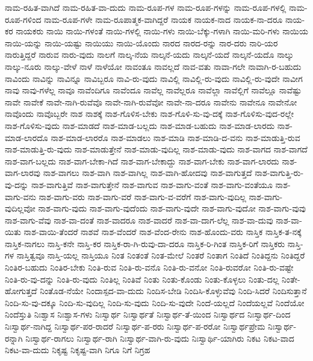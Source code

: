 {ನಾಮ-ರಹಿತ-ವಾಗಿದೆ
ನಾಮ-ರಹಿತ-ವಾ-ದುದು
ನಾಮ-ರೂಪ-ಗಳ
ನಾಮ-ರೂಪ-ಗಳನ್ನು
ನಾಮ-ರೂಪ-ಗಳಲ್ಲಿ
ನಾಮ-ರೂಪ-ಗಳಿಂದ
ನಾಮ-ರೂಪ-ಗಳೇ
ನಾಮ-ರೂಪಾತ್ಮಕ-ವಾಗಿದ್ದರೆ
ನಾಯಕ
ನಾಯಕ-ನಾದ
ನಾಯಕ-ನಾ-ದರೂ
ನಾಯ-ಕರ
ನಾಯಕರು
ನಾಯಿ
ನಾಯಿ-ಗಳಂತೆ
ನಾಯಿ-ಗಳಲ್ಲಿ
ನಾಯಿ-ಗಳು
ನಾಯಿ-ಬೆಕ್ಕು-ಗಳಾಗಿ
ನಾಯಿ-ಮರಿ-ಗಳು
ನಾಯಿಯ
ನಾಯಿ-ಯನ್ನು
ನಾಯಿ-ಯಷ್ಟು
ನಾಯಿಯು
ನಾಯಿ-ಯೊಂದು
ನಾರದ
ನಾರದ-ರನ್ನು
ನಾರ-ದರು
ನಾರಿ-ಯರ
ನಾರುತ್ತಿದ್ದರೆ
ನಾರುವ
ನಾರು-ವುದು
ನಾಲಗೆ
ನಾಲ್ಕ-ನೆಯ
ನಾಲ್ಕನೆ-ಯದು
ನಾಲ್ಕನೆ-ಯದೆ
ನಾಲ್ಕನೆ-ಯದೊ
ನಾಲ್ಕು
ನಾಲ್ಕು-ನೂರು
ನಾಲ್ಕು-ವೇಳೆ
ನಾಳೆ
ನಾಳೆಯೋ
ನಾವಂತೂ
ನಾವಲ್ಲದೆ
ನಾವ-ವತು
ನಾವಾ-ಗಲೇ
ನಾವಾಗಿ-ರ-ಬಹುದು
ನಾವಿಂದು
ನಾವಿನ್ನು
ನಾವಿನ್ನೂ
ನಾವಿಬ್ಬರೂ
ನಾವಿ-ರು-ವುದು
ನಾವಿಲ್ಲಿ
ನಾವಿಲ್ಲಿ-ರು-ವುದು
ನಾವಿಲ್ಲಿ-ರು-ವುದೇ
ನಾವೀಗ
ನಾವು
ನಾವು-ಗಳೆಲ್ಲ
ನಾವೂ
ನಾವೆಂದಿಗೂ
ನಾವೆಂದೂ
ನಾವೆಲ್ಲ
ನಾವೆಲ್ಲರೂ
ನಾವೆಲ್ಲಾ
ನಾವೆಲ್ಲಿಗೆ
ನಾವೆಲ್ಲೂ
ನಾವೆಷ್ಟು
ನಾವೇ
ನಾವೇಕೆ
ನಾವೇ-ನಾಗಿ-ರುವೆವೊ
ನಾವೇ-ನಾಗಿ-ರುವೆವೋ
ನಾವೇ-ನಾ-ದರೂ
ನಾವೇನು
ನಾವೇನೂ
ನಾವೇನೋ
ನಾವೊಂದು
ನಾವೊಬ್ಬರೇ
ನಾಶ
ನಾಶಕ್ಕೆ
ನಾಶ-ಗೊಳಿಸ-ಬೇಕು
ನಾಶ-ಗೊಳಿ-ಸು-ವು-ದಕ್ಕೆ
ನಾಶ-ಗೊಳಿಸು-ವುದ-ರಲ್ಲೇ
ನಾಶ-ಗೊಳಿಸು-ವುದು
ನಾಶ-ಮಾಡದೆ
ನಾಶ-ಮಾಡ-ಬಲ್ಲದು
ನಾಶ-ಮಾಡ-ಬಹುದು
ನಾಶ-ಮಾಡ-ಲಾರದು
ನಾಶ-ಮಾಡ-ಲಾರದೊ
ನಾಶ-ಮಾಡ-ಲಾರರೊ
ನಾಶ-ಮಾಡಲು
ನಾಶ-ಮಾಡಿ
ನಾಶ-ಮಾಡಿ-ದ-ವನು
ನಾಶ-ಮಾಡುತ್ತಿ-ರುವ
ನಾಶ-ಮಾಡುತ್ತಿ-ರು-ವುದು
ನಾಶ-ಮಾಡುತ್ತೇನೆ
ನಾಶ-ಮಾಡು-ವುದಿಲ್ಲ
ನಾಶ-ಮಾಡು-ವುದು
ನಾಶ-ವಾಗದ
ನಾಶ-ವಾಗದೆ
ನಾಶ-ವಾಗ-ಬಲ್ಲದು
ನಾಶ-ವಾಗ-ಬೇಕಾ-ಗಿದೆ
ನಾಶ-ವಾಗ-ಬೇಕಾದ್ದು
ನಾಶ-ವಾಗ-ಬೇಕು
ನಾಶ-ವಾಗ-ಲಾರದು
ನಾಶ-ವಾಗ-ಲಾರವು
ನಾಶ-ವಾಗಲು
ನಾಶ-ವಾಗಿ
ನಾಶ-ವಾಗಿಲ್ಲ
ನಾಶ-ವಾಗಿ-ಹೋದವು
ನಾಶ-ವಾಗುತ್ತದೆ
ನಾಶ-ವಾಗುತ್ತಿ-ರು-ವು-ದನ್ನು
ನಾಶ-ವಾಗುತ್ತಿವೆ
ನಾಶ-ವಾಗುತ್ತೇನೆ
ನಾಶ-ವಾಗುವ
ನಾಶ-ವಾಗು-ವಂತೆ
ನಾಶ-ವಾಗು-ವಂತೆಯೂ
ನಾಶ-ವಾಗು-ವನು
ನಾಶ-ವಾಗು-ವರು
ನಾಶ-ವಾಗು-ವರೆ
ನಾಶ-ವಾಗು-ವ-ವರೆಗೆ
ನಾಶ-ವಾಗು-ವುದಿಲ್ಲ
ನಾಶ-ವಾಗು-ವುದಿಲ್ಲವೋ
ನಾಶ-ವಾಗು-ವುದು
ನಾಶ-ವಾಗು-ವುದೆಂದು
ನಾಶ-ವಾಗು-ವುದೇ
ನಾಶ-ವಾಗು-ವುದೋ
ನಾಶ-ವಾಗು-ವುವು
ನಾಶ-ವಾಗು-ವೆವು
ನಾಶ-ವಾ-ದಂತೆ
ನಾಶ-ವಾದರೂ
ನಾಶ-ವಾದರೆ
ನಾಶ-ವಾ-ದಾಗ-ಲೆಲ್ಲ
ನಾಶ-ವಾ-ದುವು
ನಾಶ-ವಾ-ಯಿತು
ನಾಶ-ವಾಯಿ-ತೆಂದರೆ
ನಾಶವೆ
ನಾಶ-ವೆಂದರೆ
ನಾಶ-ವೆಂದ-ರೇನು
ನಾಶ-ಹೊಂದು-ವರು
ನಾಸ್ತಿಕ
ನಾಸ್ತಿಕ-ತ-ನಕ್ಕೆ
ನಾಸ್ತಿಕ-ನಾಗಲು
ನಾಸ್ತಿ-ಕನೇ
ನಾಸ್ತಿ-ಕರ
ನಾಸ್ತಿಕ-ರಾ-ಗಿ-ರುವು-ದಾ-ದರೂ
ನಾಸ್ತಿಕ-ರಿ-ಗಿಂತ
ನಾಸ್ತಿಕ-ರಿಗೆ
ನಾಸ್ತಿಕರು
ನಾಸ್ತಿ-ಗಳ
ನಾಸ್ತಿತ್ವವೂ
ನಾಸ್ತಿ-ಯಲ್ಲ
ನಾಸ್ತಿಯೂ
ನಿಂತ
ನಿಂತಂತೆ
ನಿಂತ-ಮೇಲೆ
ನಿಂತರೆ
ನಿಂತಾಗ
ನಿಂತಿದೆ
ನಿಂತಿದ್ದನು
ನಿಂತಿದ್ದರೆ
ನಿಂತಿರ-ಬಹುದು
ನಿಂತಿರ-ಬೇಕು
ನಿಂತಿ-ರುವ
ನಿಂತಿ-ರು-ವನೊ
ನಿಂತಿ-ರು-ವನೋ
ನಿಂತಿ-ರುವರೋ
ನಿಂತಿ-ರು-ವಷ್ಟೇ
ನಿಂತಿ-ರು-ವು-ದನ್ನು
ನಿಂತಿ-ರು-ವುದು
ನಿಂತಿಲ್ಲ
ನಿಂತಿವೆ
ನಿಂತು
ನಿಂತು-ಕೊಂಡು
ನಿಂತು-ಕೊಳ್ಳಲು
ನಿಂತು-ದಲ್ಲ
ನಿಂತೇ-ಹೋಗುತ್ತದೆ
ನಿಂತೊಡ-ನೆಯೇ
ನಿಂದಾಸ್ಪದ-ವಾ-ದುದು
ನಿಂದಿಸ-ಬೇಡಿ
ನಿಂದಿಸಿ-ಕೊಳ್ಳುವೆವು
ನಿಂದಿ-ಸಿದರೆ
ನಿಂದಿಸುತ್ತಾನೆ
ನಿಂದಿ-ಸು-ವು-ದಕ್ಕೂ
ನಿಂದಿ-ಸು-ವುದಿಲ್ಲ
ನಿಂದಿ-ಸು-ವುದು
ನಿಂದಿ-ಸು-ವುದೇ
ನಿಂದೆ-ಯಲ್ಲದೆ
ನಿಂದೆಯಲ್ಲವೆ
ನಿಂದೆಯೋ
ನಿಂದೆಸ್ತುತಿ
ನಿಃಶ್ವಾಸ
ನಿಃಶ್ವಾಸ-ಗಳು
ನಿಃಸ್ವಾರ್ಥ
ನಿಃಸ್ವಾರ್ಥತೆ
ನಿಃಸ್ವಾರ್ಥ-ತೆ-ಯಿಂದ
ನಿಃಸ್ವಾರ್ಥದ
ನಿಃಸ್ವಾರ್ಥ-ದಿಂದ
ನಿಃಸ್ವಾರ್ಥ-ನಾಗಿದ್ದ
ನಿಃಸ್ವಾರ್ಥ-ಪರ-ರಾದರೆ
ನಿಃಸ್ವಾರ್ಥ-ಪ-ರರು
ನಿಃಸ್ವಾರ್ಥ-ಪ-ರರೋ
ನಿಃಸ್ವಾರ್ಥಪ್ರೇಮ
ನಿಃಸ್ವಾರ್ಥ-ರನ್ನಾಗಿ
ನಿಃಸ್ವಾರ್ಥ-ರಾಗಲು
ನಿಃಸ್ವಾರ್ಥ-ರಾಗಿ
ನಿಃಸ್ವಾರ್ಥ-ವಾಗಿ-ರು-ವುದು
ನಿಃಸ್ವಾರ್ಥಿ-ಯಾಗಿರು
ನಿಕಟ
ನಿಕಟ-ವಾದ
ನಿಕಟ-ವಾ-ದುದು
ನಿಕೃಷ್ಟ
ನಿಕೃಷ್ಟ-ವಾಗಿ
ನಿಗೂ
ನಿಗೆ
ನಿಗ್ರಹ
}

